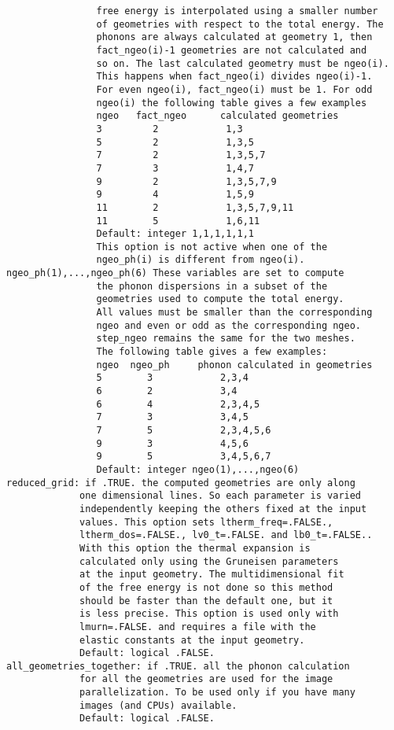 \documentclass[12pt,a4paper,twoside]{report}
\begin{document}
\begin{verbatim}
                free energy is interpolated using a smaller number 
                of geometries with respect to the total energy. The 
                phonons are always calculated at geometry 1, then 
                fact_ngeo(i)-1 geometries are not calculated and 
                so on. The last calculated geometry must be ngeo(i). 
                This happens when fact_ngeo(i) divides ngeo(i)-1. 
                For even ngeo(i), fact_ngeo(i) must be 1. For odd 
                ngeo(i) the following table gives a few examples
                ngeo   fact_ngeo      calculated geometries
                3         2            1,3
                5         2            1,3,5
                7         2            1,3,5,7
                7         3            1,4,7
                9         2            1,3,5,7,9
                9         4            1,5,9
                11        2            1,3,5,7,9,11
                11        5            1,6,11
                Default: integer 1,1,1,1,1,1
                This option is not active when one of the 
                ngeo_ph(i) is different from ngeo(i).
ngeo_ph(1),...,ngeo_ph(6) These variables are set to compute 
                the phonon dispersions in a subset of the 
                geometries used to compute the total energy. 
                All values must be smaller than the corresponding 
                ngeo and even or odd as the corresponding ngeo. 
                step_ngeo remains the same for the two meshes.
                The following table gives a few examples:
                ngeo  ngeo_ph     phonon calculated in geometries
                5        3            2,3,4
                6        2            3,4
                6        4            2,3,4,5
                7        3            3,4,5
                7        5            2,3,4,5,6
                9        3            4,5,6
                9        5            3,4,5,6,7
                Default: integer ngeo(1),...,ngeo(6)
reduced_grid: if .TRUE. the computed geometries are only along 
             one dimensional lines. So each parameter is varied 
             independently keeping the others fixed at the input 
             values. This option sets ltherm_freq=.FALSE., 
             ltherm_dos=.FALSE., lv0_t=.FALSE. and lb0_t=.FALSE..
             With this option the thermal expansion is 
             calculated only using the Gruneisen parameters 
             at the input geometry. The multidimensional fit 
             of the free energy is not done so this method 
             should be faster than the default one, but it
             is less precise. This option is used only with 
             lmurn=.FALSE. and requires a file with the 
             elastic constants at the input geometry.
             Default: logical .FALSE.
all_geometries_together: if .TRUE. all the phonon calculation 
             for all the geometries are used for the image 
             parallelization. To be used only if you have many 
             images (and CPUs) available.
             Default: logical .FALSE.
\end{verbatim}
\end{document}

